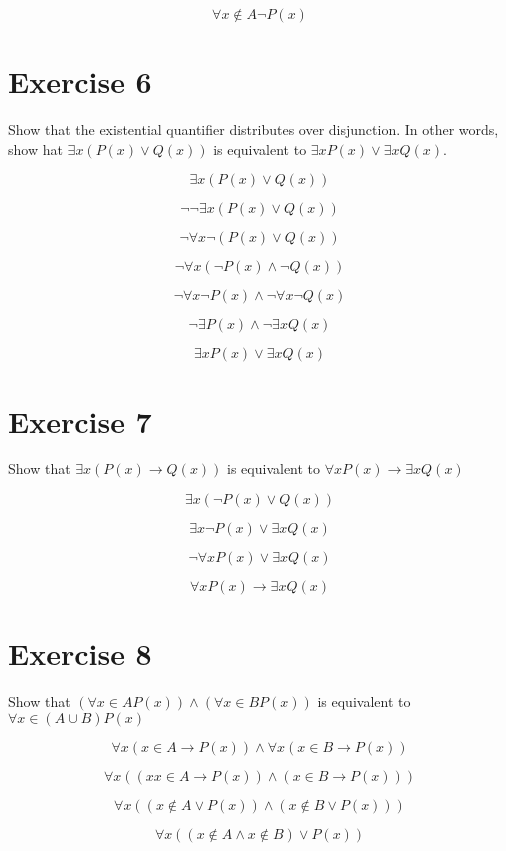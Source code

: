 \documentclass[11pt]{article}
\newcommand{\then}{\rightarrow}
\begin{document}
$$\forall x \notin A \neg P(x)$$

\section*{Exercise 6}

Show that the existential quantifier distributes over disjunction. In other
words, show hat $\exists x (P(x) \vee Q(x))$ is equivalent to 
$\exists x P(x) \vee \exists x Q(x)$.

$$\exists x (P(x) \vee Q(x))$$

$$\neg \neg \exists x (P(x) \vee Q(x))$$

$$\neg \forall x \neg (P(x) \vee Q(x))$$

$$\neg \forall x (\neg P(x) \wedge \neg Q(x))$$

$$\neg \forall x \neg P(x) \wedge \neg \forall x \neg Q(x)$$

$$\neg \exists P(x) \wedge \neg \exists x Q(x)$$

$$\exists x P(x) \vee \exists x Q(x)$$

\section*{Exercise 7} 

Show that $\exists x (P(x) \then Q(x))$ is equivalent to 
$\forall x P(x) \then \exists x Q(x)$

$$\exists x (\neg P(x) \vee Q(x))$$

$$\exists x \neg P(x) \vee \exists x Q(x)$$

$$\neg \forall x P(x) \vee \exists x Q(x)$$

$$\forall x P(x) \then \exists x Q(x)$$

\section*{Exercise 8}

Show that $(\forall x \in A P(x)) \wedge (\forall x \in B P(x))$ is equivalent 
to $\forall x \in (A \cup B) P(x)$

$$\forall x (x \in A \then P(x)) \wedge \forall x (x \in B \then P(x))$$

$$\forall x ((x x \in A \then P(x)) \wedge (x \in B \then P(x)))$$

$$\forall x ((x \notin A \vee P(x)) \wedge (x \notin B \vee P(x)))$$

$$\forall x ((x \notin A \wedge x \notin B) \vee P(x))$$
\end{document}

